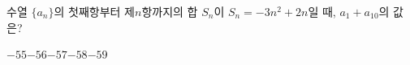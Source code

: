 수열 $\{a_n\}$의 첫째항부터 제$n$항까지의 합 $S_n$이 $S_n=-3n^2+2n$일 때, $a_1+a_{10}$의 값은?
\begin{choices32}{$-55$}{$-56$}{$-57$}{$-58$}{$-59$}\end{choices32}
